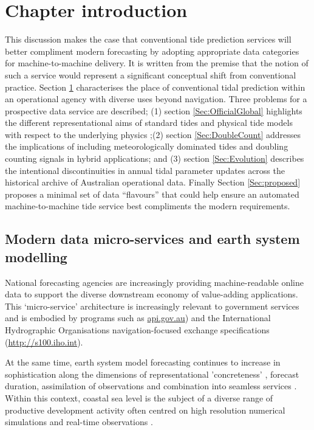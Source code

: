 \section{Chapter introduction}
\label{Sec:intro}
This discussion makes the case that conventional tide prediction services will better compliment modern forecasting by adopting appropriate data categories for machine-to-machine delivery.  It is written from the premise that the notion of such a service would represent a significant conceptual shift from conventional practice.  Section \ref{Sec:intro} characterises the place of conventional tidal prediction within an operational agency with diverse uses beyond navigation. Three problems for a prospective data service are described; (1) section \ref{Sec:OfficialGlobal} highlights the different representational aims of standard tides and physical tide models with respect to the underlying physics ;(2) section \ref{Sec:DoubleCount} addresses the implications of including meteorologically dominated tides and doubling counting signals in hybrid applications; and (3) section \ref{Sec:Evolution} describes the intentional discontinuities in annual tidal parameter updates across the historical archive of Australian operational data.   Finally Section \ref{Sec:proposed} proposes a minimal set of data ``flavours'' that could help ensure an automated machine-to-machine tide service best compliments the modern requirements. 


\subsection{Modern data micro-services and earth system modelling}
National forecasting agencies are increasingly providing machine-readable online data to support the diverse downstream economy of value-adding applications.
This `micro-service' architecture \citep{BCG2020} is increasingly relevant to government services and is embodied by programs such as  \url{api.gov.au}) and the International Hydrographic Organisations  navigation-focused exchange specifications (\url{http://s100.iho.int}).

 
At the same time, earth system model forecasting continues to increase in sophistication along the dimensions of representational 'concreteness' \citep{Petersen:2012kp}, forecast duration, assimilation of observations and combination into seamless services \citep{BOM2020}.
Within this context, coastal sea level is the subject of a diverse range of productive development activity often centred on high resolution numerical simulations and real-time observations \citep{10.3389/fmars.2019.00437}. 


